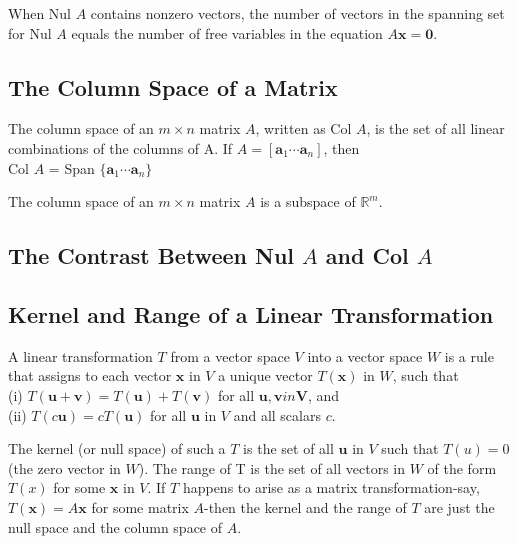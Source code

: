 \documentclass[12pt,a4paper]{article}
\renewcommand{\vec}[1]{\boldsymbol{#1}}
\begin{document}
When Nul $A$ contains nonzero vectors, the number of vectors in the spanning set for Nul $A$ equals the number of free variables in the equation $A \vec{x} = \vec{0}$.



\subsection{The Column Space of a Matrix}

\begin{tcolorbox}[colback=green!5,colframe=green!40!black,title= Definition]
The column space of an $m\times n$ matrix $A$, written as Col $A$, is the set of all linear
combinations of the columns of A. If $A = [\vec{a}_1 \cdots \vec{a}_n]$, then \\
Col $A$ = Span $\{\vec{a}_1 \cdots \vec{a}_n \}$
\end{tcolorbox}

\begin{tcolorbox}[colback=green!5,colframe=green!40!black,title= Theorem]
The column space of an $m\times n$ matrix $A$ is a subspace of $\mathbb{R}^m$.
\end{tcolorbox}

\subsection{The Contrast Between Nul $A$ and Col $A$}





\subsection{Kernel and Range of a Linear Transformation}

\begin{tcolorbox}[colback=green!5,colframe=green!40!black,title= Definition]
A linear transformation $T$ from a vector space $V$ into a vector space $W$ is a rule that assigns to each vector $\vec{x}$ in $V$ a unique vector $T(\vec{x})$ in $W$, such that \\
(i) $T(\vec{u} + \vec{v}) = T(\vec{u}) +T(\vec{v})$ for all $\vec{u}, \vec{v} in \vec{V}$, and \\
(ii) $T(c\vec{u}) = cT(\vec{u})$ for all $\vec{u}$ in $V$ and all scalars $c$.
\end{tcolorbox}
The kernel (or null space) of such a $T$ is the set of all $\vec{u}$ in $V$ such that $T(u) = 0$ (the zero vector in $W$). The range of T is the set of all vectors in $W$ of the form $T(x)$ for some $\vec{x}$ in $V$. If $T$ happens to arise as a matrix transformation-say, $T(\vec{x}) = A\vec{x}$ for some matrix $A$-then the kernel and the range of $T$ are just the null space and the column space of $A$.
\end{document}
